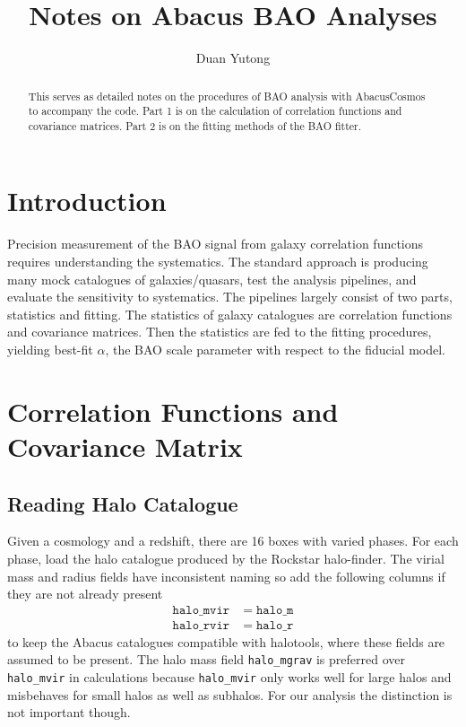 \documentclass[10pt,A4]{aastex62}
\begin{document}
\title{Notes on Abacus BAO Analyses}

\author[0000-0002-0786-7307]{Duan Yutong}

\begin{abstract}
This serves as detailed notes on the procedures of BAO analysis with AbacusCosmos to accompany the code. Part 1 is on the calculation of correlation functions and covariance matrices. Part 2 is on the fitting methods of the BAO fitter.
\end{abstract}



\section{Introduction}

Precision measurement of the BAO signal from galaxy correlation functions requires understanding the systematics. The standard approach is producing many mock catalogues of galaxies/quasars, test the analysis pipelines, and evaluate the sensitivity to systematics. The pipelines largely consist of two parts, statistics and fitting. The statistics of galaxy catalogues are correlation functions and covariance matrices. Then the statistics are fed to the fitting procedures, yielding best-fit $\alpha$, the BAO scale parameter with respect to the fiducial model.

\section{Correlation Functions and Covariance Matrix}

	\subsection{Reading Halo Catalogue}
		
		Given a cosmology and a redshift, there are 16 boxes with varied phases. For each phase, load the halo catalogue produced by the Rockstar halo-finder. The virial mass and radius fields have inconsistent naming so add the following columns if they are not already present
		\begin{align}
			\mathtt{halo\_mvir} & = \mathtt{halo\_m} \\
			\mathtt{halo\_rvir} & = \mathtt{halo\_r}
		\end{align}
		to keep the Abacus catalogues compatible with halotools, where these fields are assumed to be present. The halo mass field \texttt{halo\_mgrav} is preferred over \texttt{halo\_mvir} in calculations because \texttt{halo\_mvir} only works well for large halos and misbehaves for small halos as well as subhalos. For our analysis the distinction is not important though. 
		
\end{document}
